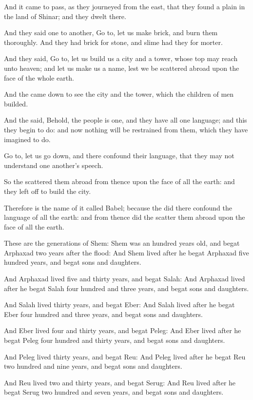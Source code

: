 \verse And it came to pass, as they journeyed from the east, that they found a plain in the land of Shinar; and they dwelt there.

\verse And they said one to another, Go to, let us make brick, and burn them thoroughly. And they had brick for stone, and slime had they for morter.

\verse And they said, Go to, let us build us a city and a tower, whose top may reach unto heaven; and let us make us a name, lest we be scattered abroad upon the face of the whole earth.

\verse And the \LORD came down to see the city and the tower, which the children of men builded.

\verse And the \LORD said, Behold, the people is one, and they have all one language; and this they begin to do: and now nothing will be restrained from them, which they have imagined to do.

\verse Go to, let us go down, and there confound their language, that they may not understand one another's speech.

\verse So the \LORD scattered them abroad from thence upon the face of all the earth: and they left off to build the city.

\verse Therefore is the name of it called Babel; because the \LORD did there confound the language of all the earth: and from thence did the \LORD scatter them abroad upon the face of all the earth.

\verse These are the generations of Shem: Shem was an hundred years old, and begat Arphaxad two years after the flood: \verse And Shem lived after he begat Arphaxad five hundred years, and begat sons and daughters.

\verse And Arphaxad lived five and thirty years, and begat Salah: \verse And Arphaxad lived after he begat Salah four hundred and three years, and begat sons and daughters.

\verse And Salah lived thirty years, and begat Eber: \verse And Salah lived after he begat Eber four hundred and three years, and begat sons and daughters.

\verse And Eber lived four and thirty years, and begat Peleg: \verse And Eber lived after he begat Peleg four hundred and thirty years, and begat sons and daughters.

\verse And Peleg lived thirty years, and begat Reu: \verse And Peleg lived after he begat Reu two hundred and nine years, and begat sons and daughters.

\verse And Reu lived two and thirty years, and begat Serug: \verse And Reu lived after he begat Serug two hundred and seven years, and begat sons and daughters.

